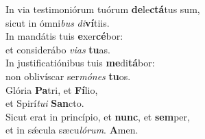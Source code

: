 \evenverse In via testimoniórum tuórum \textbf{de}le\textbf{ctá}tus sum,~\*\\
\evenverse sicut in ómni\textit{bus} \textit{di}\textbf{ví}tiis.\\
\oddverse In mandátis tuis \textbf{e}xer\textbf{cé}bor:~\*\\
\oddverse et considerábo \textit{vi}\textit{as} \textbf{tu}as.\\
\evenverse In justificatiónibus tuis \textbf{me}di\textbf{tá}bor:~\*\\
\evenverse non oblivíscar ser\textit{mó}\textit{nes} \textbf{tu}os.\\
\oddverse Glória \textbf{Pa}tri, et \textbf{Fí}lio,~\*\\
\oddverse et Spirí\textit{tu}\textit{i} \textbf{San}cto.\\
\evenverse Sicut erat in princípio, et \textbf{nunc}, et \textbf{sem}per,~\*\\
\evenverse et in sǽcula sæcu\textit{ló}\textit{rum}. \textbf{A}men.\\
